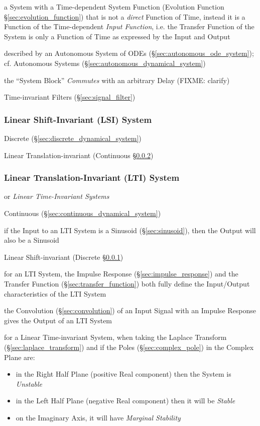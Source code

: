 a System with a Time-dependent System Function (Evolution Function
\S\ref{sec:evolution_function}) that is not a \emph{direct} Function of Time,
instead it is a Function of the Time-dependent \emph{Input Function}, i.e. the
Transfer Function of the System is only a Function of Time as expressed by the
Input and Output

described by an Autonomous System of ODEs (\S\ref{sec:autonomous_ode_system});
cf. Autonomous Systems (\S\ref{sec:autonomous_dynamical_system})

the ``System Block'' \emph{Commutes} with an arbitrary Delay (FIXME: clarify)

\fist Time-invariant Filters (\S\ref{sec:signal_filter})



\subsubsection{Linear Shift-Invariant (LSI) System}\label{sec:lsi_system}

Discrete (\S\ref{sec:discrete_dynamical_system})

\fist Linear Translation-invariant (Continuous \S\ref{sec:lti_system})



\subsubsection{Linear Translation-Invariant (LTI) System}
\label{sec:lti_system}

or \emph{Linear Time-Invariant Systems}

Continuous (\S\ref{sec:continuous_dynamical_system})

if the Input to an LTI System is a Sinusoid (\S\ref{sec:sinusoid}), then the
Output will also be a Sinusoid

\fist Linear Shift-invariant (Discrete \S\ref{sec:lsi_system})

for an LTI System, the Impulse Response (\S\ref{sec:impulse_response}) and the
Transfer Function (\S\ref{sec:transfer_function}) both fully define the
Input/Output characteristics of the LTI System

the Convolution (\S\ref{sec:convolution}) of an Input Signal with an Impulse
Response gives the Output of an LTI System

for a Linear Time-invariant System, when taking the Laplace Transform
(\S\ref{sec:laplace_transform}) and if the Poles (\S\ref{sec:complex_pole}) in
the Complex Plane are:
\begin{itemize}
  \item in the Right Half Plane (positive Real component) then the System is
    \emph{Unstable}
  \item in the Left Half Plane (negative Real component) then it will be
    \emph{Stable}
  \item on the Imaginary Axis, it will have \emph{Marginal Stability}
\end{itemize}



